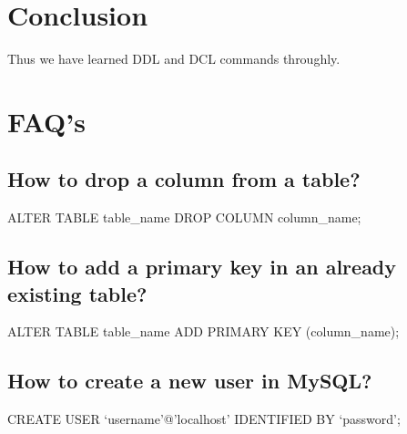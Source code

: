 \documentclass{article}
\begin{document}
\section{\textbf{Conclusion}}
Thus we have learned DDL and DCL commands throughly.
\section{\textbf{FAQ's}}
\subsection{\textbf{How to drop a column from a table?}}
ALTER TABLE table\_name
DROP COLUMN column\_name;
\subsection{\textbf{How to add a primary key in an already existing table?}}
ALTER TABLE table\_name
ADD PRIMARY KEY (column\_name);
\subsection{\textbf{How to create a new user in MySQL?}}
CREATE USER `username'@'localhost' IDENTIFIED BY `password';
\end{document}
